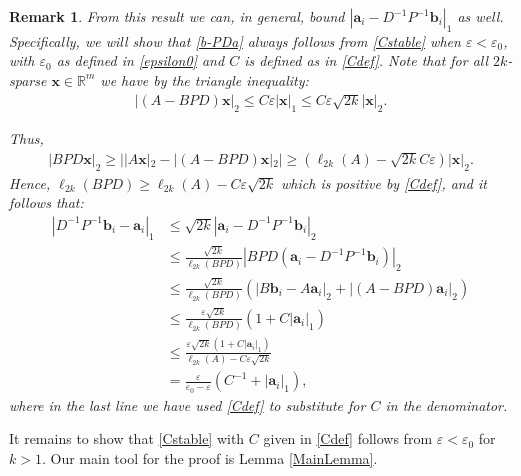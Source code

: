 \documentclass[journal, onecolumn]{IEEEtran}
\newtheorem{remark}{Remark}
\begin{document}
\begin{remark}\label{b-PDaProof}
From this result we can, in general, bound $|\mathbf{a}_i - D^{-1}P^{-1}\mathbf{b}_i|_1$ as well. Specifically, we will show that \eqref{b-PDa} always follows from \eqref{Cstable} when $\varepsilon < \varepsilon_0$, with $\varepsilon_0$ as defined in \eqref{epsilon0} and $C$ is defined as in \eqref{Cdef}. Note that for all $2k$-sparse $\mathbf{x} \in \mathbb{R}^m$ we have by the triangle inequality:
\begin{align*}
|(A-BPD)\mathbf{x}|_2 
\leq C\varepsilon|\mathbf{x}|_1
\leq C \varepsilon \sqrt{2k}  |\mathbf{x}|_2.
\end{align*}

Thus,
\begin{align*}
|BPD\mathbf{x}|_2 
\geq | |A\mathbf{x}|_2 - |(A-BPD)\mathbf{x}|_2 |
\geq (\ell_{2k}(A) - \sqrt{2k}C\varepsilon ) |\mathbf{x}|_2.
\end{align*}
Hence, $\ell_{2k}(BPD) \geq \ell_{2k}(A) - C\varepsilon \sqrt{2k}$ which is positive by \eqref{Cdef}, and it follows that:
\begin{align*}
|D^{-1}P^{-1}\mathbf{b}_i - \mathbf{a}_i|_1
&\leq \sqrt{2k} |\mathbf{a}_i - D^{-1}P^{-1}\mathbf{b}_i|_2 \\
&\leq \frac{\sqrt{2k}}{\ell_{2k}(BPD)}|BPD(\mathbf{a}_i - D^{-1}P^{-1}\mathbf{b}_i)|_2 \\
&\leq \frac{\sqrt{2k}}{\ell_{2k}(BPD)} (|B\mathbf{b}_i - A\mathbf{a}_i|_2 + |(A - BPD)\mathbf{a}_i|_2) \\
&\leq \frac{\varepsilon\sqrt{2k}}{\ell_{2k}(BPD)}(1+C|\mathbf{a}_i|_1) \\
&\leq \frac{\varepsilon\sqrt{2k}(1+C|\mathbf{a}_i|_1)}{\ell_{2k}(A) - C\varepsilon\sqrt{2k}} \\
&= \frac{\varepsilon }{\varepsilon_0 - \varepsilon} \left( C^{-1}+|\mathbf{a}_i|_1 \right),
\end{align*}
%
where in the last line we have used \eqref{Cdef} to substitute for $C$ in the denominator.  
\end{remark}


It remains to show that \eqref{Cstable} with $C$ given in \eqref{Cdef} follows from $\varepsilon < \varepsilon_0$ for $k > 1$. Our main tool for the proof is Lemma \ref{MainLemma}.


\end{document}

